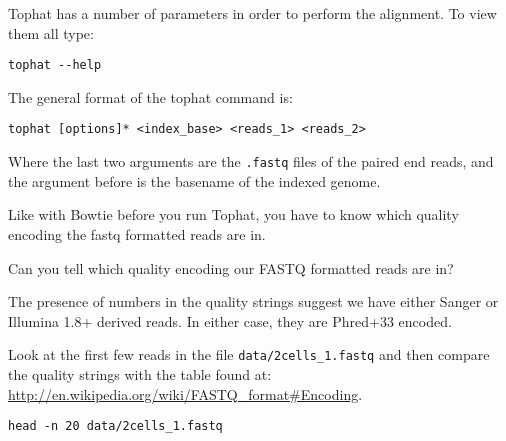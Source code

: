 \begin{steps}
Tophat has a number of parameters in order to perform the alignment. To view them all type:
\begin{lstlisting}
tophat --help
\end{lstlisting}
\end{steps}

\begin{information}
The general format of the tophat command is:
\begin{lstlisting}
tophat [options]* <index_base> <reads_1> <reads_2>
\end{lstlisting}

Where the last two arguments are the \texttt{.fastq} files of the paired end reads, and the argument
before is the basename of the indexed genome.
\end{information}

\begin{note}
Like with Bowtie before you run Tophat, you have to know which quality encoding the fastq
formatted reads are in.
\end{note}

\begin{questions}
Can you tell which quality encoding our FASTQ formatted reads are in?
\begin{answer}
The presence of numbers in the quality strings suggest we have either Sanger or
Illumina 1.8+ derived reads. In either case, they are Phred+33 encoded.
\end{answer}

\begin{information}
Look at the first few reads in the file \texttt{data/2cells\_1.fastq} and
then compare the quality strings with the table found at:
\url{http://en.wikipedia.org/wiki/FASTQ_format#Encoding}. 
\begin{lstlisting}
head -n 20 data/2cells_1.fastq
\end{lstlisting}
\end{information}
\end{questions}

